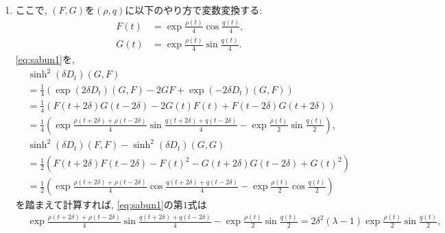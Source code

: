 \documentclass[a4paper]{ujarticle}
\numberwithin{equation}{section}
\theoremstyle{definition}
\begin{document}
\begin{enumerate}
        \item ここで, $(F, G)$を$(\rho, q)$に以下のやり方で変数変換する:
        \begin{align}
            F(t) &= \exp \frac{\rho(t)}{4} \cos{\frac{q(t)}{4}}, \\
            G(t) &= \exp \frac{\rho(t)}{4} \sin{\frac{q(t)}{4}}.
        \end{align}
        \eqref{eq:sabun1}を, 
        \begin{align}
            &\sinh^2(\delta D_{t})(G, F) \\
            &= \frac{1}{4}(\exp(2 \delta D_t)(G, F) - 2 G F + \exp(- 2 \delta D_t)(G, F)) \\
            &= \frac{1}{4}(F(t + 2 \delta) G( t - 2 \delta) - 2G(t)F(t) + F(t - 2 \delta) G( t + 2 \delta)) \\
            &= \frac{1}{4}\left(\exp \frac{\rho(t + 2 \delta) + \rho(t - 2 \delta)}{4} \sin{\frac{q(t + 2 \delta) + q(t - 2 \delta)}{4}} - \exp \frac{\rho(t)}{2} \sin{\frac{q(t)}{2}} \right), \\
            &\sinh^2(\delta D_{t})(F, F) - \sinh^2(\delta D_{t})(G, G) \\
            &= \frac{1}{2}(F(t + 2 \delta) F( t - 2 \delta) - F(t)^2  - G(t + 2 \delta) G( t - 2 \delta) + G(t)^2) \\
            &= \frac{1}{2}\left( \exp \frac{\rho(t + 2 \delta) + \rho(t - 2 \delta)}{4} \cos{\frac{q(t + 2 \delta) + q(t - 2 \delta)}{4}} - \exp \frac{\rho(t)}{2} \cos{\frac{q(t)}{2}} \right)
        \end{align}
        を踏まえて計算すれば, \eqref{eq:sabun1}の第$1$式は
        \begin{align}
            &\exp \frac{\rho(t + 2 \delta) + \rho(t - 2 \delta)}{4} \sin{\frac{q(t + 2 \delta) + q(t - 2 \delta)}{4}} - \exp \frac{\rho(t)}{2} \sin{\frac{q(t)}{2}} 
            = 2 \delta^2 (\lambda - 1) \exp \frac{\rho(t)}{2} \sin{\frac{q(t)}{2}}, \\

\end{align}
\end{enumerate}
\end{document}
